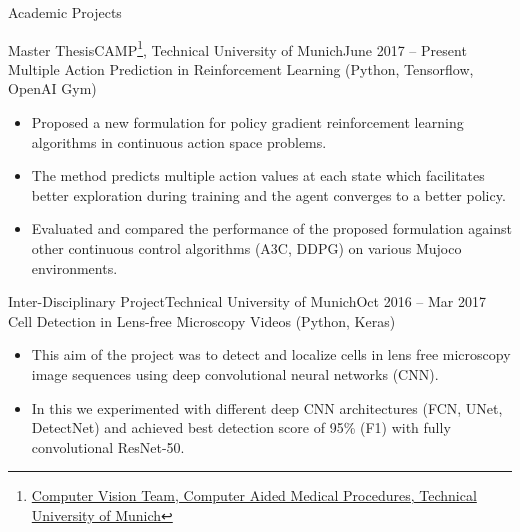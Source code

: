 \documentclass[]{mcdowellcv}
\begin{document}
	\makeheader
	
	\begin{cvsection}{Academic Projects}
	\begin{cvsubsection}[2]{Master Thesis}{CAMP\footnote{\href{http://campar.in.tum.de/Chair/ResearchIssueComputerVision}{Computer Vision Team, Computer Aided Medical Procedures, Technical University of Munich}}, Technical University of Munich}{June 2017 -- Present}
    Multiple Action Prediction in Reinforcement Learning (Python, Tensorflow, OpenAI Gym) \cite{anonymous2018predicting}
        \begin{itemize}
	        \item Proposed a new formulation for policy gradient reinforcement learning algorithms in continuous action space problems.
	        \item The method predicts multiple action values at each state which facilitates better exploration during training and the agent converges to a better policy.
	        \item Evaluated and compared the performance of the proposed formulation against other continuous control algorithms (A3C, DDPG) on various Mujoco environments.
	    \end{itemize}
	\end{cvsubsection}
	
	\begin{cvsubsection}{Inter-Disciplinary Project}{Technical University of Munich}{Oct 2016 -- Mar 2017}
	Cell Detection in Lens-free Microscopy Videos (Python, Keras) \cite{rempfler-2017}
    	\begin{itemize}
    	\item This aim of the project was to detect and localize cells in lens free microscopy image sequences using deep convolutional neural networks (CNN).
        \item In this we experimented with different deep CNN architectures (FCN, UNet, DetectNet) and achieved best detection score of 95\% (F1) with fully convolutional ResNet-50.
    	\end{itemize}
	\end{cvsubsection}
	
	\end{cvsection}
	
\end{document}
